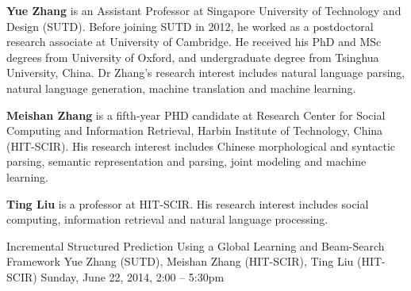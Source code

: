 \begin{bio}
{\bfseries Yue Zhang} is an Assistant Professor at Singapore University of Technology and Design (SUTD). Before joining SUTD in 2012, he worked as a postdoctoral research associate at University of Cambridge. He received his PhD and MSc degrees from University of Oxford, and undergraduate degree from Tsinghua University, China. Dr Zhang’s research interest includes natural language parsing, natural language generation, machine translation and machine learning.

{\bfseries Meishan Zhang} is a fifth-year PHD candidate at Research Center for Social Computing and Information Retrieval, Harbin Institute of Technology, China (HIT-SCIR). His research interest includes Chinese morphological and syntactic parsing, semantic representation and parsing, joint modeling and machine learning.

{\bfseries Ting Liu} is a professor at HIT-SCIR. His research interest includes
social computing, information retrieval and natural language
processing.
\end{bio}

\begin{tutorial}{Incremental Structured Prediction Using a Global Learning and Beam-Search Framework}
  {Yue Zhang (SUTD), Meishan Zhang (HIT-SCIR), Ting Liu (HIT-SCIR)}
  {Sunday, June 22, 2014, 2:00 -- 5:30pm}
  {\TutLocH}


\end{tutorial}
